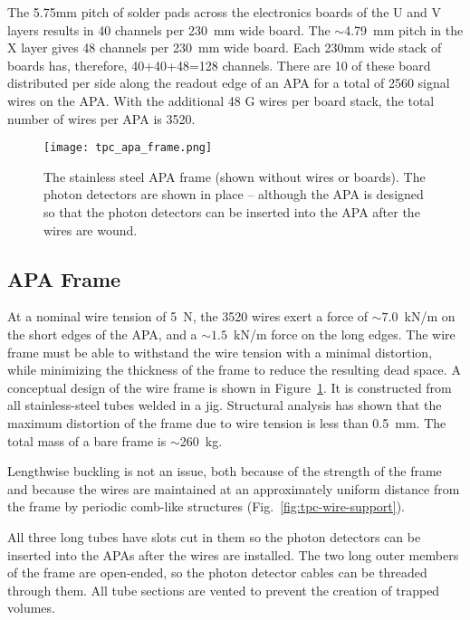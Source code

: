 The 5.75mm pitch of solder pads across the electronics boards of the U and V layers results in 40 channels per 230~mm wide board.  The $\sim$4.79~mm pitch in the X layer gives 48 channels per 230~mm wide board.  Each 230mm wide stack of boards has, therefore, 40+40+48=128 channels.  There are 10 of these board distributed per side along the readout edge of an APA for a total of 2560 signal wires on the APA.  With the additional 48 G wires per board stack, the total number of wires per APA is 3520.




\begin{figure}[htpb]
\centering
\texttt{[image: tpc\_apa\_frame.png]}
\caption[Conceptual design of a wire frame]{The stainless steel APA frame (shown without wires or boards). The photon detectors are shown in place – although the APA is designed so that the photon detectors can be inserted into the APA after the wires are wound. }
\label{fig:tpc-wire-frame}
\end{figure}

\subsection{APA Frame}

At a nominal wire tension of 5~N, the 3520 wires exert a force of 
$\sim 7.0$~kN/m on the short edges of the APA, and a 
$\sim 1.5 $~kN/m force on the long edges. The wire 
frame must be able to withstand the wire tension with a minimal 
distortion, while minimizing the thickness of the 
frame to reduce the resulting dead space. A conceptual design 
of the wire frame is shown in Figure~\ref{fig:tpc-wire-frame}.  
It is constructed from all stainless-steel tubes welded in a jig.  
Structural analysis has shown that the maximum distortion of the frame due to wire tension is less than 0.5~mm. The total mass of a bare frame is $\sim$260~kg.

Lengthwise buckling is not an issue, both because of the strength of the frame and because the wires are maintained at an approximately uniform distance from the frame by periodic comb-like structures (Fig.~\ref{fig:tpc-wire-support}).

All three long tubes have slots cut in them so the photon detectors can be inserted into the APAs after the wires are installed.  The two long outer members of the frame are open-ended, so the photon detector cables can be threaded through them.  All tube sections are vented to prevent the creation of trapped volumes.



